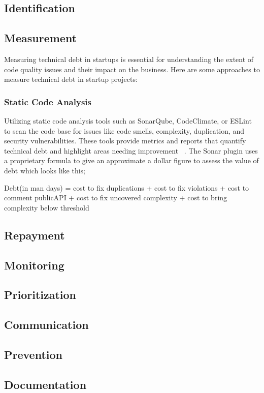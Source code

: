 \subsection{Identification}

\subsection{Measurement}
Measuring technical debt in startups is essential for understanding the extent of code quality issues and their impact on the business. Here are some approaches to measure technical debt in startup projects:

\subsubsection{Static Code Analysis} 
Utilizing static code analysis tools such as SonarQube, CodeClimate, or ESLint to scan the code base for issues like code smells, complexity, duplication, and security vulnerabilities. These tools provide metrics and reports that quantify technical debt and highlight areas needing improvement ~\cite{Whopayso60:online}. The Sonar plugin uses a proprietary formula to give an approximate a dollar figure to assess the value of debt which looks like this;

Debt(in man days) = cost to fix duplications + cost to fix violations + cost to comment publicAPI + cost to fix uncovered complexity + cost to bring complexity below threshold

\subsection{Repayment}

\subsection{Monitoring}
\subsection{Prioritization}
\subsection{Communication}
\subsection{Prevention}
\subsection{Documentation}

